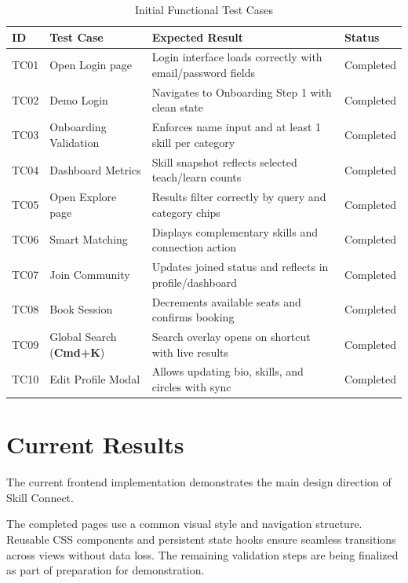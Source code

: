 \documentclass[12pt,a4paper]{report}
\begin{document}
\begin{table}[H]
\centering
\caption{Initial Functional Test Cases}
\label{tab:testcases}
\vspace{0.25cm}
\small
\begin{tabular}{p{1.2cm} p{3.8cm} p{5.5cm} p{2.2cm}}
\toprule
\textbf{ID} & \textbf{Test Case} & \textbf{Expected Result} & \textbf{Status} \\
\midrule
TC01 & Open Login page & Login interface loads correctly with email/password fields & Completed \\
TC02 & Demo Login & Navigates to Onboarding Step 1 with clean state & Completed \\
TC03 & Onboarding Validation & Enforces name input and at least 1 skill per category & Completed \\
TC04 & Dashboard Metrics & Skill snapshot reflects selected teach/learn counts & Completed \\
TC05 & Open Explore page & Results filter correctly by query and category chips & Completed \\
TC06 & Smart Matching & Displays complementary skills and connection action & Completed \\
TC07 & Join Community & Updates joined status and reflects in profile/dashboard & Completed \\
TC08 & Book Session & Decrements available seats and confirms booking & Completed \\
TC09 & Global Search (\textbf{Cmd+K}) & Search overlay opens on shortcut with live results & Completed \\
TC10 & Edit Profile Modal & Allows updating bio, skills, and circles with sync & Completed \\
\bottomrule
\end{tabular}
\end{table}

\section{Current Results}
The current frontend implementation demonstrates the main design direction of Skill Connect.

The completed pages use a common visual style and navigation structure. Reusable CSS components and persistent state hooks ensure seamless transitions across views without data loss.
The remaining validation steps are being finalized as part of preparation for demonstration.

\newpage
\end{document}
